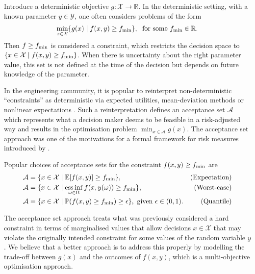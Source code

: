 \documentclass[main.tex]{subfiles}
\begin{document}
Introduce a deterministic objective $g:\mathcal{X}
\to\mathbb{R}$. In the deterministic setting, with a known parameter
$y\in\mathcal{Y}$, one often considers problems of the form
\begin{align}
  \min_{x\in\mathcal{X}}\{g(x)\mid f(x,y)\geq f_{\textnormal{min}} \},\;
  \text{ for some } f_{\textnormal{min}}\in\mathbb{R}.
\end{align}
Then $f\geq f_{\textnormal{min}}$ is considered a constraint, which restricts the
decision space to $\{x\in\mathcal{X}\mid f(x,y)\geq f_{\textnormal{min}}\}$.
When there is uncertainty about the right parameter value, this set is
not defined at the time of the decision but depends on future knowledge
of the parameter.

In the engineering community, it is popular to
reinterpret non-deterministic ``constraints'' as deterministic via
expected utilities, mean-deviation methods or nonlinear
expectations
\citep{rockafellar2007coherent,rockafellar2015engineering}.
Such a reinterpretation defines an acceptance set $\mathcal{A}$
which represents what a decision maker deems to be feasible in a
risk-adjusted way and results in the optimisation problem
$\min_{x\in\mathcal{A}} g(x)$.
The acceptance set approach was one of the motivations for a formal
framework for risk measures introduced by \citet{artzner1999coherent}.
\begin{example}
  Popular choices of acceptance sets for the constraint $f(x,y)\geq
  f_{\textnormal{min}}$ are
  \begin{align}
    \mathcal{A}&=\{x\in\mathcal{X} \mid
                 \mathbb{E}[f(x,y)]\geq f_{\textnormal{min}}\},
    &\textnormal{(Expectation)}\\
    \mathcal{A}&=\{x\in\mathcal{X} \mid
                 \operatorname*{ess\,inf}_{\omega\in\Omega}f(x,y(\omega))\geq
                 f_{\textnormal{min}}\},
    &\textnormal{(Worst-case)}\\
    \mathcal{A} &= \{x\in\mathcal{X}\mid
                  \mathbb{P}(f(x,y)\geq f_{\textnormal{min}})\geq \epsilon\},
                  \text{ given }\epsilon\in(0,1).
    &\textnormal{(Quantile)}
  \end{align}
\end{example}

The acceptance set approach treats what was previously considered a
hard constraint in terms of marginalised values that allow decisions $x\in\mathcal{X}$
that may violate the originally intended constraint for some values of the random
variable $y$. We believe that a better approach is to address this
properly by modelling the trade-off between $g(x)$ and the outcomes of $f(x,y)$,
which is a multi-objective optimisation approach.
\end{document}

